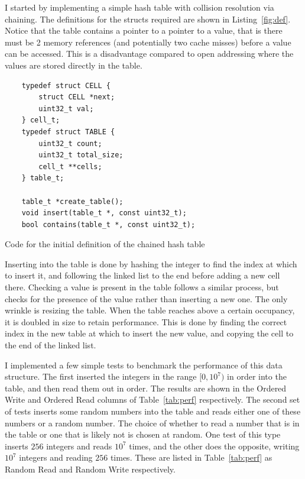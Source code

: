 \documentclass[12pt]{article}
\begin{document}
I started by implementing a simple hash table with collision resolution via chaining. 
The definitions for the structs required are shown in Listing~\ref{fig:def}. Notice that
the table contains a pointer to a pointer to a value, that is there must be 2 memory 
references (and potentially two cache misses) before a value can be accessed. This is a
disadvantage compared to open addressing where the values are stored directly in the table.
\begin{listing}
    \centering
    \begin{minipage}[t]{.5\textwidth}
    \begin{verbatim}
    typedef struct CELL {
        struct CELL *next;
        uint32_t val;
    } cell_t;
    typedef struct TABLE {
        uint32_t count;
        uint32_t total_size;
        cell_t **cells;
    } table_t;
    
    table_t *create_table();
    void insert(table_t *, const uint32_t);
    bool contains(table_t *, const uint32_t);
\end{verbatim}
\end{minipage}
\caption{Code for the initial definition of the chained hash table}
\label{fig:def}
\end{listing}

Inserting into the table is done by hashing the integer to find the index at which to insert it, and following the linked
list to the end before adding a new cell there. Checking a value is present in the table follows a similar process, but
checks for the presence of the value rather than inserting a new one. The only wrinkle is resizing the table. When the 
table reaches above a certain occupancy, it is doubled in size to retain performance. This is done by finding the 
correct index in the new table at which to insert the new value, and copying the cell to the end of the linked list.

I implemented a few simple tests to benchmark the performance of this data structure. The first inserted the integers
in the range $[0, 10^7)$ in order into the table, and then read them out in order. The results are shown in the 
Ordered Write and Ordered Read columns of Table~\ref{tab:perf} respectively. The second set of tests inserts some random
numbers into the table and reads either one of these numbers or a random number. The choice of whether to read a number 
that is in the table or one that is likely not is chosen at random. One test of this type inserts $256$ integers 
and reads $10^7$ times, and the other does the opposite, writing $10^7$ integers and reading $256$ times. These are 
listed in Table~\ref{tab:perf} as Random Read and Random Write respectively. 
\end{document}

